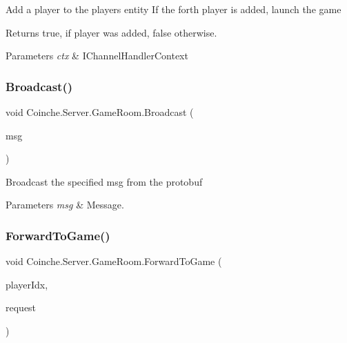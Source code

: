 Add a player to the players entity If the forth player is added, launch the game \begin{DoxyReturn}{Returns}
{\ttfamily true}, if player was added, {\ttfamily false} otherwise.
\end{DoxyReturn}

\begin{DoxyParams}{Parameters}
{\em ctx} & I\+Channel\+Handler\+Context\\
\hline
\end{DoxyParams}


\mbox{\label{class_coinche_1_1_server_1_1_game_room_ae245ed33e990ce4721b15eaa29f8af1a}} 
\subsubsection{\texorpdfstring{Broadcast()}{Broadcast()}}
{\footnotesize\ttfamily void Coinche.\+Server.\+Game\+Room.\+Broadcast (\begin{DoxyParamCaption}\item[{\hyperlink{class_coinche_1_1_google_1_1_protobuf_1_1_game_response}{Game\+Response}}]{msg }\end{DoxyParamCaption})\hspace{0.3cm}{\ttfamily [inline]}}



Broadcast the specified msg from the protobuf 


\begin{DoxyParams}{Parameters}
{\em msg} & Message.\\
\hline
\end{DoxyParams}
\mbox{\label{class_coinche_1_1_server_1_1_game_room_a2fdaf1a02333b68864d248906816305d}} 
\subsubsection{\texorpdfstring{Forward\+To\+Game()}{ForwardToGame()}}
{\footnotesize\ttfamily void Coinche.\+Server.\+Game\+Room.\+Forward\+To\+Game (\begin{DoxyParamCaption}\item[{int}]{player\+Idx,  }\item[{\hyperlink{class_coinche_1_1_google_1_1_protobuf_1_1_game_request}{Game\+Request}}]{request }\end{DoxyParamCaption})\hspace{0.3cm}{\ttfamily [inline]}}



